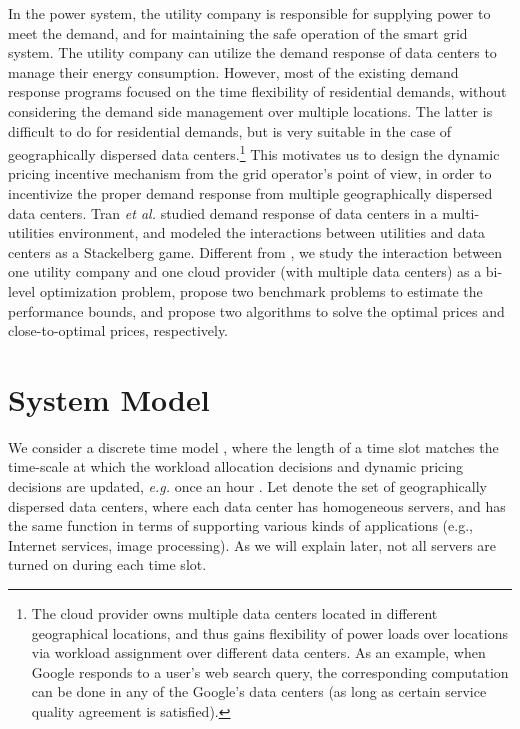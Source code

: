\documentclass[journal]{IEEEtran}
\begin{document}
	In the power system, the utility company is responsible for supplying power to meet the demand, and for maintaining the safe operation of the smart grid system. The utility company can utilize the demand response of data centers to manage their energy consumption. However, most of the existing demand response programs focused on the time flexibility of residential demands, without considering the demand side management over multiple locations. The latter is difficult to do for residential demands, but is very suitable in the case of geographically dispersed data centers.\footnote{The cloud provider owns multiple data centers located in different geographical locations, and thus gains flexibility of power loads over locations via workload assignment over different data centers. As an example, when Google responds to a user's web search query, the corresponding computation can be done in any of the Google's data centers (as long as certain service quality agreement is satisfied).} This motivates us to design the dynamic pricing incentive mechanism from the grid operator's point of view, in order to incentivize the proper demand response from multiple geographically dispersed data centers. Tran \textit{et al.} \cite{MultiDC} studied demand response of data centers in a multi-utilities environment, and modeled the interactions between utilities and data centers as a Stackelberg game. Different from \cite{MultiDC}, we study the interaction between one utility company and one cloud provider (with multiple data centers) as a bi-level optimization problem, propose two benchmark problems to estimate the performance bounds, and propose two algorithms to solve the optimal prices and close-to-optimal prices, respectively.
	
	
	\section{System Model}
	We consider a discrete time model , where the length of a time slot matches the time-scale at which the workload allocation decisions and dynamic pricing decisions are updated, \emph{e.g.} once an hour \cite{infocom}. Let  denote the set of geographically dispersed data centers, where each data center  has  homogeneous servers, and has the same function in terms of supporting various kinds of applications (e.g., Internet services, image processing). As we will explain later, not all servers are turned on during each time slot. 
	
\end{document}
